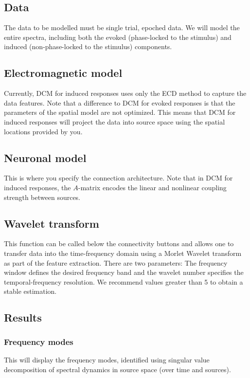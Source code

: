 \subsection{Data}
The data to be modelled must be single trial, epoched data. We will model the entire spectra, including both the evoked (phase-locked to the stimulus) and induced (non-phase-locked to the stimulus) components.

\subsection{Electromagnetic model}
Currently, DCM for induced responses uses only the ECD method to capture the data features. Note that a difference to DCM for evoked responses is that the parameters of the spatial model are not optimized. This means that DCM for induced responses will project the data into source space using the spatial locations provided by you.


\subsection{Neuronal model}
This is where you specify the connection architecture. Note that in DCM for induced responses, the $A$-matrix encodes the linear and nonlinear coupling strength between sources.


\subsection{Wavelet transform}
This function can be called below the connectivity buttons and allows one to transfer data into the time-frequency domain using a Morlet Wavelet transform as part of the feature extraction.  There are two parameters: The frequency window defines the desired frequency band and the wavelet number specifies the temporal-frequency resolution. We recommend values greater than 5 to obtain a stable estimation.

\subsection{Results}

\subsubsection{Frequency modes}
This will display the frequency modes, identified using singular value decomposition of spectral dynamics in source space (over time and sources).


